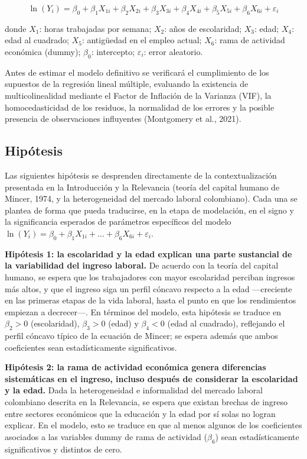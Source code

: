 \documentclass[
  spanish,
  letterpaper,
  DIV=11,
  numbers=noendperiod]{scrartcl}
\begin{document}
\[\ln(Y_i)=\beta_0+\beta_1X_{1i}+\beta_2X_{2i}
+\beta_3X_{3i}
+\beta_4X_{4i}
+\beta_5X_{5i}
+\beta_6X_{6i}
+\varepsilon_i\]

donde \(X_1\): horas trabajadas por semana; \(X_2\): años de
escolaridad; \(X_3\): edad; \(X_4\): edad al cuadrado; \(X_5\):
antigüedad en el empleo actual; \(X_6\): rama de actividad económica
(dummy); \(\beta_0\): intercepto; \(\varepsilon_i\): error aleatorio.

Antes de estimar el modelo definitivo se verificará el cumplimiento de
los supuestos de la regresión lineal múltiple, evaluando la existencia
de multicolinealidad mediante el Factor de Inflación de la Varianza
(VIF), la homocedasticidad de los residuos, la normalidad de los errores
y la posible presencia de observaciones influyentes (Montgomery et al.,
2021).

\subsection{Hipótesis}\label{hipuxf3tesis}

Las siguientes hipótesis se desprenden directamente de la
contextualización presentada en la Introducción y la Relevancia (teoría
del capital humano de Mincer, 1974, y la heterogeneidad del mercado
laboral colombiano). Cada una se plantea de forma que pueda traducirse,
en la etapa de modelación, en el signo y la significancia esperados de
parámetros específicos del modelo
\(\ln(Y_i)=\beta_0+\beta_1X_{1i}+\dots+\beta_6X_{6i}+\varepsilon_i\).

\textbf{Hipótesis 1: la escolaridad y la edad explican una parte
sustancial de la variabilidad del ingreso laboral.} De acuerdo con la
teoría del capital humano, se espera que los trabajadores con mayor
escolaridad perciban ingresos más altos, y que el ingreso siga un perfil
cóncavo respecto a la edad ---creciente en las primeras etapas de la
vida laboral, hasta el punto en que los rendimientos empiezan a
decrecer---. En términos del modelo, esta hipótesis se traduce en
\(\beta_2>0\) (escolaridad), \(\beta_3>0\) (edad) y \(\beta_4<0\) (edad
al cuadrado), reflejando el perfil cóncavo típico de la ecuación de
Mincer; se espera además que ambos coeficientes sean estadísticamente
significativos.

\textbf{Hipótesis 2: la rama de actividad económica genera diferencias
sistemáticas en el ingreso, incluso después de considerar la escolaridad
y la edad.} Dada la heterogeneidad e informalidad del mercado laboral
colombiano descrita en la Relevancia, se espera que existan brechas de
ingreso entre sectores económicos que la educación y la edad por sí
solas no logran explicar. En el modelo, esto se traduce en que al menos
algunos de los coeficientes asociados a las variables dummy de rama de
actividad (\(\beta_6\)) sean estadísticamente significativos y distintos
de cero.
\end{document}
